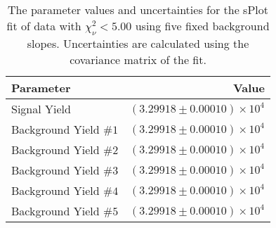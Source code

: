 
\begin{table}[ht]
    \begin{center}
        \begin{tabular}{lr}\toprule
            Parameter & Value \\\midrule
            Signal Yield & $(3.29918 \pm 0.00010) \times 10^{4}$ \\
            Background Yield $\#1$ & $(3.29918 \pm 0.00010) \times 10^{4}$ \\
            Background Yield $\#2$ & $(3.29918 \pm 0.00010) \times 10^{4}$ \\
            Background Yield $\#3$ & $(3.29918 \pm 0.00010) \times 10^{4}$ \\
            Background Yield $\#4$ & $(3.29918 \pm 0.00010) \times 10^{4}$ \\
            Background Yield $\#5$ & $(3.29918 \pm 0.00010) \times 10^{4}$ \\\bottomrule
        \end{tabular}
        \caption{The parameter values and uncertainties for the sPlot fit of data with $\chi^2_\nu < 5.00$ using five fixed background slopes. Uncertainties are calculated using the covariance matrix of the fit.}\label{tab:splot-fit-results-chisqdof-5.00-fixed-5}
    \end{center}
\end{table}
